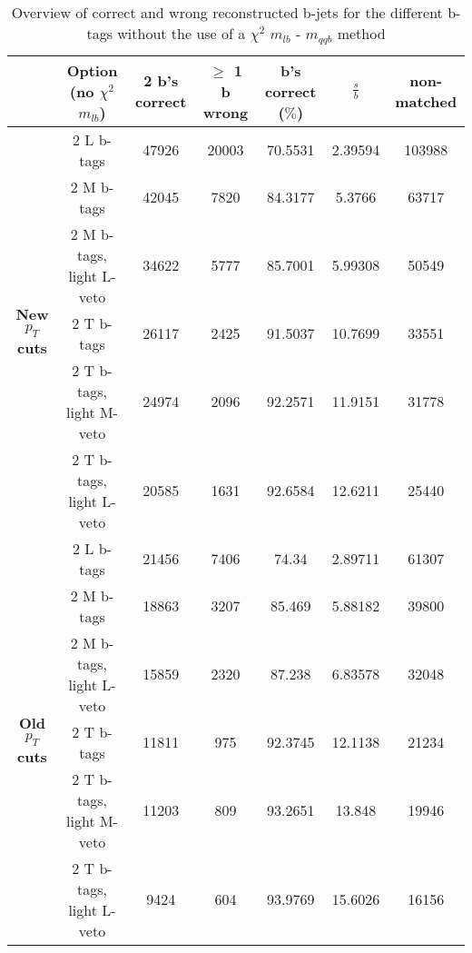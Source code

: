 \begin{landscape}
 \begin{table}[!h] 
 \begin{tabular}{c|c|c|c|c|c|c} 
&\textbf{Option} (no $\chi^{2}$ $m_{lb}$) & 2 b's correct & $\geq$ 1 b wrong & b's correct ($\%$) & $\frac{s}{b}$ & non-matched \\ \hline 
\multirow{6}{*}{\textbf{New $p_T$ cuts}} 
& 2 L b-tags              & 47926 & 20003 & 70.5531 & 2.39594 & 103988  \\ 
& 2 M b-tags              & 42045 & 7820 & 84.3177 & 5.3766 & 63717  \\ 
& 2 M b-tags, light L-veto & 34622 & 5777 & 85.7001 & 5.99308 & 50549  \\ 
& 2 T b-tags              & 26117 & 2425 & 91.5037 & 10.7699 & 33551  \\ 
& 2 T b-tags, light M-veto & 24974 & 2096 & 92.2571 & 11.9151 & 31778  \\ 
& 2 T b-tags, light L-veto & 20585 & 1631 & 92.6584 & 12.6211 & 25440  \\ 
\hline
\multirow{6}{*}{\textbf{Old $p_T$ cuts}} 
& 2 L b-tags              & 21456 & 7406 & 74.34 & 2.89711 & 61307  \\ 
& 2 M b-tags              & 18863 & 3207 & 85.469 & 5.88182 & 39800  \\ 
& 2 M b-tags, light L-veto & 15859 & 2320 & 87.238 & 6.83578 & 32048  \\ 
& 2 T b-tags              & 11811 & 975 & 92.3745 & 12.1138 & 21234  \\ 
& 2 T b-tags, light M-veto & 11203 & 809 & 93.2651 & 13.848 & 19946  \\ 
& 2 T b-tags, light L-veto & 9424 & 604 & 93.9769 & 15.6026 & 16156  \\ 
 \end{tabular} 
\caption{Overview of correct and wrong reconstructed b-jets for the different b-tags without the use of a $\chi^{2}$ $m_{lb}$ - $m_{qqb}$ method} 
 \end{table} 
 

\end{landscape}
